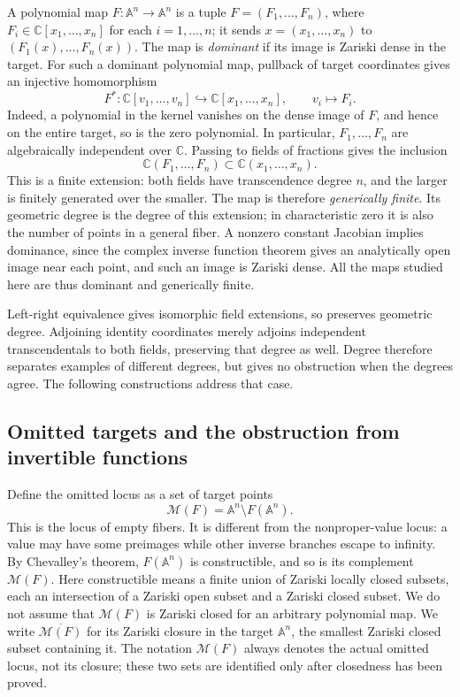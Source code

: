 \documentclass[11pt]{article}
\numberwithin{equation}{section}
\theoremstyle{plain}
\theoremstyle{definition}
\theoremstyle{remark}
\newcommand{\C}{\mathbb{C}}
\newcommand{\A}{\mathbb{A}}
\newcommand{\Miss}{\mathcal M}
\begin{document}
A polynomial map $F:\A^n\to\A^n$ is a tuple
$F=(F_1,\ldots,F_n)$, where
$F_i\in\C[x_1,\ldots,x_n]$ for each $i=1,\ldots,n$; it sends
$x=(x_1,\ldots,x_n)$ to $(F_1(x),\ldots,F_n(x))$.
The map is \emph{dominant} if its image is Zariski dense in the target.
For such a dominant polynomial map, pullback of target coordinates gives
an injective homomorphism
\[
 F^*:\C[v_1,\ldots,v_n]\hookrightarrow\C[x_1,\ldots,x_n],
 \qquad v_i\longmapsto F_i.
\]
Indeed, a polynomial in the kernel vanishes on the dense image of $F$,
and hence on the entire target, so is the zero polynomial. In particular,
$F_1,\ldots,F_n$ are algebraically independent over $\C$.
Passing to fields of fractions gives the inclusion
\[
 \C(F_1,\ldots,F_n)\subset\C(x_1,\ldots,x_n).
\]
This is a finite extension: both fields have transcendence degree $n$, and
the larger is finitely generated over the smaller. The map is therefore
\emph{generically finite}. Its geometric degree is the degree of this
extension; in characteristic zero it is also the number of points in a
general fiber. A nonzero constant Jacobian implies dominance, since the
complex inverse function theorem gives an analytically open image near
each point, and such an image is Zariski dense. All the maps studied here
are thus dominant and generically finite.

Left-right equivalence gives isomorphic field extensions, so preserves
geometric degree. Adjoining identity coordinates merely adjoins independent
transcendentals to both fields, preserving that degree as well. Degree
therefore separates examples of different degrees, but gives no obstruction
when the degrees agree. The following constructions address that case.

\subsection{Omitted targets and the obstruction from invertible functions}
Define the omitted locus as a set of target points
\[
 \Miss(F)=\A^n\setminus F(\A^n).
\]
This is the locus of empty fibers. It is different from the nonproper-value
locus: a value may have some preimages while other inverse branches escape
to infinity. By Chevalley's theorem, $F(\A^n)$ is constructible,
and so is its complement $\Miss(F)$. Here constructible means a finite
union of Zariski locally closed subsets, each an intersection of a
Zariski open subset and a Zariski closed subset. We do not assume that
$\Miss(F)$ is Zariski closed for an arbitrary polynomial map.
We write $\overline{\Miss(F)}$ for its Zariski closure in the target
$\A^n$, the smallest Zariski closed subset containing it. The notation
$\Miss(F)$ always denotes the actual omitted locus, not its closure;
these two sets are identified only after closedness has been proved.
\end{document}
